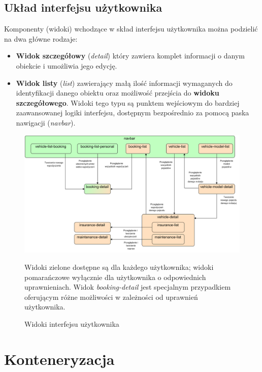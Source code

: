\documentclass[eng,printmode,openany]{mgr}
\begin{document}
\subsection{Układ interfejsu użytkownika}
Komponenty (widoki) wchodzące w skład interfejsu użytkownika można podzielić na dwa główne rodzaje:
\begin{itemize}
	\item \textbf{Widok szczegółowy} (\textit{detail}) który zawiera komplet informacji o danym obiekcie i umożliwia jego edycję.
	\item \textbf{Widok listy} (\textit{list}) zawierający małą ilość informacji wymaganych do identyfikacji danego obiektu oraz możliwość przejścia do \textbf{widoku szczegółowego}. Widoki tego typu są punktem wejściowym do bardziej zaawansowanej logiki interfejsu, dostępnym bezpośrednio za pomocą paska nawigacji (\textit{navbar}).
\end{itemize}
\begin{figure}[h]
	\centering
	\includegraphics[scale=0.62]{images/angular_views.png}
	\caption{Widoki interfejsu użytkownika}
	\small 
	Widoki zielone dostępne są dla każdego użytkownika; widoki pomarańczowe wyłącznie dla użytkownika o odpowiednich uprawnieniach. Widok \textit{booking-detail} jest specjalnym przypadkiem oferującym różne możliwości w zależności od uprawnień użytkownika.
\end{figure}

\section{Konteneryzacja}
\end{document}
